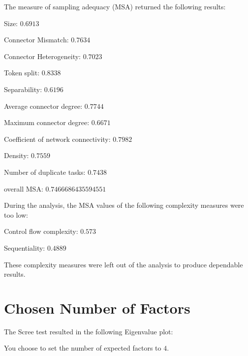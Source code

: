 \documentclass[a4paper]{article}
\begin{document}
The measure of sampling adequacy (MSA) returned the following results:
\begin{compactitem}
\item Size: $0.6913$
\item Connector Mismatch: $0.7634$
\item Connector Heterogeneity: $0.7023$
\item Token split: $0.8338$
\item Separability: $0.6196$
\item Average connector degree: $0.7744$
\item Maximum connector degree: $0.6671$
\item Coefficient of network connectivity: $0.7982$
\item Density: $0.7559$
\item Number of duplicate tasks: $0.7438$
\item overall MSA: $0.7466686435594551$
\end{compactitem}

\noindent
During the analysis, the MSA values of the following complexity measures were too low:
\begin{compactitem}
\item Control flow complexity: $0.573$
\item Sequentiality: $0.4889$
\end{compactitem}
These complexity measures were left out of the analysis to produce dependable results.

\section*{Chosen Number of Factors}
The Scree test resulted in the following Eigenvalue plot:
\begin{center}
\end{center}
You choose to set the number of expected factors to $4$.
\end{document}
